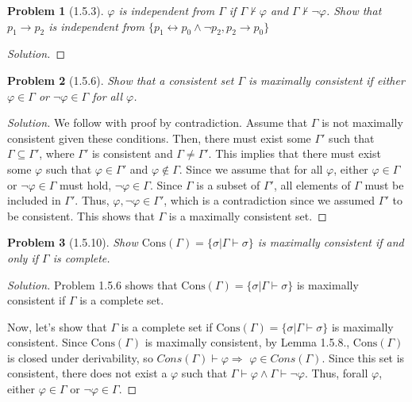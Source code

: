 \documentclass[letter]{article}
\newtheorem{problem}{Problem}
\theoremstyle{definition}
\newenvironment{solution}
{\begin{proof}[Solution]}
        {\end{proof}}
\renewcommand{\phi}{\varphi}
\begin{document}
\begin{problem}[1.5.3] $\phi$ is \textit{independent} from $\Gamma$ if
    $\Gamma \not \vdash \phi$ and $\Gamma \not \vdash \neg \phi$. Show that $p_1 \to p_2$ is independent from $\{p_1 \leftrightarrow p_0 \land \neg p_2, p_2 \to p_0\}$
\end{problem}
\begin{solution}
\end{solution}


\begin{problem}[1.5.6] Show that a consistent set $\Gamma$ is maximally consistent if either 
  $\phi \in \Gamma$ or $\neg \phi \in \Gamma$ for all $\phi$.
\end{problem}
\begin{solution}
We follow with proof by contradiction. Assume that $\Gamma$ is not maximally consistent given these
conditions. Then, there must exist some $\Gamma ' $ such that $\Gamma \subseteq \Gamma '$, where
$\Gamma '$ is consistent and $\Gamma \neq \Gamma '$. This implies that there must exist some
$\phi$ such that $\phi \in \Gamma'$ and $\phi \notin \Gamma$. Since we assume that for all $\phi$,
either $\phi \in \Gamma$ or $\neg \phi \in \Gamma$ must hold, $\neg \phi \in \Gamma$.
Since $\Gamma$ is a subset of $\Gamma'$, all elements of $\Gamma$ must be included in $\Gamma'$.
Thus, ${\phi, \neg \phi}\in \Gamma'$, which is a contradiction since we assumed $\Gamma'$ to be
consistent. This shows that $\Gamma$ is a maximally consistent set.
\end{solution}


\begin{problem}[1.5.10] Show $\textrm{Cons}(\Gamma) = \{ \sigma | \Gamma \vdash \sigma \}$ is maximally consistent if and only if $\Gamma$ is complete.
\end{problem}
\begin{solution}

  Problem 1.5.6 shows that $\textrm{Cons}(\Gamma) = \{ \sigma | \Gamma \vdash \sigma \}$ is maximally
  consistent if $\Gamma$ is a complete set.
  
  Now, let's show that $\Gamma$ is a complete set if $\textrm{Cons}(\Gamma) = \{ \sigma | \Gamma 
  \vdash \sigma \}$ is maximally consistent. Since $\textrm{Cons}(\Gamma)$ is maximally consistent, 
  by Lemma 1.5.8., $\textrm{Cons}(\Gamma)$ is closed under derivability, so $Cons(\Gamma) \vdash \phi \Rightarrow $
  $\phi \in Cons(\Gamma)$. Since this set is consistent, there does not exist a $\phi$ such that
  $\Gamma \vdash \phi \land \Gamma \vdash \neg \phi$. Thus, forall $\phi$, either $\phi \in \Gamma$
  or $\neg \phi \in \Gamma$.
\end{solution}
\end{document}
